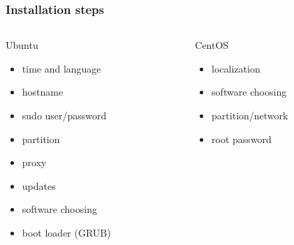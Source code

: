 \begin{frame}[fragile]
\frametitle{Installation steps}
\begin{columns}
\begin{column}{0.5\textwidth}
   {\Large Ubuntu}
    \begin{itemize}       
        \item time and language
        \item hostname
        \item sudo user/password
        \item partition
        \item proxy
        \item updates
        \item software choosing
        \item boot loader (GRUB)
    \end{itemize}
\end{column}
\begin{column}{0.5\textwidth}  %
   {\Large CentOS}
    \begin{itemize}       
        \item localization
        \item software choosing
        \item partition/network
        \item root password
    \end{itemize}
\end{column}
\end{columns}
\end{frame}

